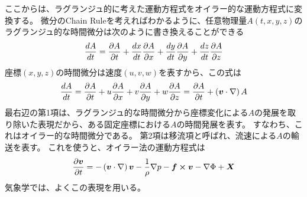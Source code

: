 \documentclass[a4paper,11pt,platex]{jsarticle}
\numberwithin{equation}{section}
\newcommand{\spartial}[2]{{\partial #1 \over \partial #2}}
\begin{document}
ここからは、ラグランジュ的に考えた運動方程式をオイラー的な運動方程式に変換する。
微分のChain Ruleを考えればわかるように、任意物理量$A\left(t, x, y, z\right)$のラグランジュ的な時間微分は次のように書き換えることができる
\begin{equation}
    {dA \over dt} = \spartial{A}{t} + {dx \over dt}\spartial{A}{x} + {dy \over dt}\spartial{A}{y} + {dz \over dt}\spartial{A}{z}
\end{equation}
座標$\left(x, y, z\right)$の時間微分は速度$\left(u, v, w\right)$を表すから、この式は
\begin{equation}
    {dA \over dt}
    = \spartial{A}{t} + u\spartial{A}{x} + v\spartial{A}{y} + w\spartial{A}{z}
    = \spartial{A}{t} + \left(\vb*{v} \cdot \nabla\right)A
\end{equation}
最右辺の第1項は、ラグランジュ的な時間微分から座標変化による$A$の発展を取り除いた表現だから、ある固定座標における$A$の時間発展を表す。
すなわち、これはオイラー的な時間微分である。
第2項は移流項と呼ばれ、流速による$A$の輸送を表す。
これを使うと、オイラー法の運動方程式は
\begin{equation}
    \label{euler_eom}
    \spartial{\vb*{v}}{t} = -\left(\vb*{v} \cdot \nabla\right)\vb*{v} -{1 \over \rho} \nabla p - \vb*{f} \cross \vb*{v} - \nabla \Phi + \vb*{X}
\end{equation}
気象学では、よくこの表現を用いる。
\end{document}
